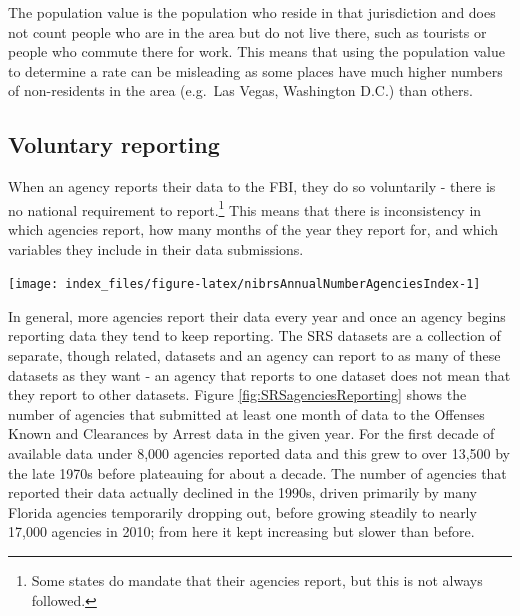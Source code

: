 \documentclass[
]{krantz}
\let\origfigure\figure
\let\endorigfigure\endfigure
\renewenvironment{figure}[1][2] {
    \expandafter\origfigure\expandafter[H]
} {
    \endorigfigure
}
\begin{document}
The population value is the population who reside in that
jurisdiction and does not count people who are in the area
but do not live there, such as tourists or people who
commute there for work. This means that using the population
value to determine a rate can be misleading as some places
have much higher numbers of non-residents in the area
(e.g.~Las Vegas, Washington D.C.) than others.

\subsection{Voluntary reporting}\label{voluntary}

When an agency reports their data to the FBI, they do so
voluntarily - there is no national requirement to
report.\footnote{Some states do mandate that their agencies
  report, but this is not always followed.} This means that
there is inconsistency in which agencies report, how many
months of the year they report for, and which variables they
include in their data submissions.

\begin{figure}

{\centering \texttt{[image: index\_files/figure-latex/nibrsAnnualNumberAgenciesIndex-1]} 

}

\caption{The annual number of police agencies that report data to NIBRS.}\label{fig:nibrsAnnualNumberAgenciesIndex}
\end{figure}

In general, more agencies report their data every year and
once an agency begins reporting data they tend to keep
reporting. The SRS datasets are a collection of separate,
though related, datasets and an agency can report to as many
of these datasets as they want - an agency that reports to
one dataset does not mean that they report to other
datasets. Figure \ref{fig:SRSagenciesReporting} shows the
number of agencies that submitted at least one month of data
to the Offenses Known and Clearances by Arrest data in the
given year. For the first decade of available data under
8,000 agencies reported data and this grew to over 13,500 by
the late 1970s before plateauing for about a decade. The
number of agencies that reported their data actually
declined in the 1990s, driven primarily by many Florida
agencies temporarily dropping out, before growing steadily
to nearly 17,000 agencies in 2010; from here it kept
increasing but slower than before.
\end{document}
